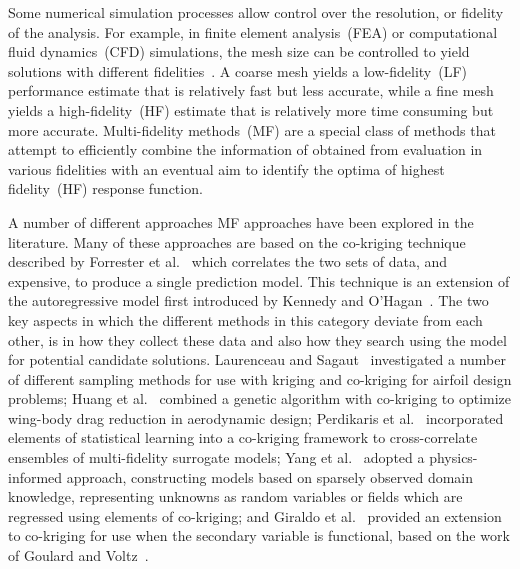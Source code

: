 Some numerical simulation processes allow control over the resolution, or fidelity of the analysis. For example, in finite element analysis~(FEA) or computational fluid dynamics~(CFD) simulations, the mesh size can be controlled to yield solutions with different fidelities~\cite{branke2016efficient,toal2015some}. A coarse mesh yields a low-fidelity~(LF) performance estimate that is relatively fast but less accurate, while a fine mesh yields a high-fidelity~(HF) estimate that is relatively more time consuming but more accurate. Multi-fidelity methods~(MF) are a special class of methods that attempt to efficiently combine the information of obtained from evaluation in various fidelities with an eventual aim to identify the optima of highest fidelity~(HF) response function. 

A number of different approaches MF approaches have been explored in the literature. Many of these approaches are based on the co-kriging technique described by Forrester et al.~\cite{forrester2007multi} which correlates the two sets of data,  and expensive, to produce a single prediction model. This technique is an extension of the autoregressive model first introduced by Kennedy and O'Hagan~\cite{kennedy2000predicting}. The two key aspects in which the different methods in this category deviate from each other, is in how they collect these data and also how they search using the model for potential candidate solutions. Laurenceau and Sagaut~\cite{laurenceau2008building} investigated a number of different sampling methods for use with kriging and co-kriging for airfoil design problems; Huang et al.~\cite{huang2013research} combined a genetic algorithm with co-kriging to optimize wing-body drag reduction in aerodynamic design; Perdikaris et al.~\cite{perdikaris2015multi} incorporated elements of statistical learning into a co-kriging framework to cross-correlate ensembles of multi-fidelity surrogate models; Yang et al.~\cite{yang2019physics} adopted a physics-informed approach, constructing models based on sparsely observed domain knowledge, representing unknowns as random variables or fields which are regressed using elements of co-kriging; and Giraldo et al.~\cite{giraldo2020cokriging} provided an extension to co-kriging for use when the secondary variable is functional, based on the work of Goulard and Voltz~\cite{goulard1993geostatistical}.

